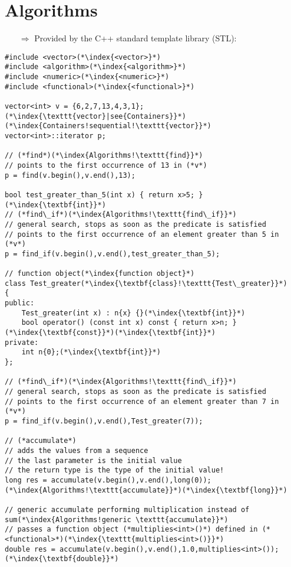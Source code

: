 \documentclass[10pt]{article}
\begin{document}
\section{Algorithms}
\small
\begin{enumerate}
\item[$\Rightarrow$] Provided by the C++ standard template library (STL):
\end{enumerate}
\begin{lstlisting}
#include <vector>(*\index{<vector>}*)
#include <algorithm>(*\index{<algorithm>}*)
#include <numeric>(*\index{<numeric>}*)
#include <functional>(*\index{<functional>}*)

vector<int> v = {6,2,7,13,4,3,1};(*\index{\texttt{vector}|see{Containers}}*)(*\index{Containers!sequential!\texttt{vector}}*)
vector<int>::iterator p;

// (*find*)(*\index{Algorithms!\texttt{find}}*)
// points to the first occurrence of 13 in (*v*)
p = find(v.begin(),v.end(),13);

bool test_greater_than_5(int x) { return x>5; }(*\index{\textbf{int}}*)
// (*find\_if*)(*\index{Algorithms!\texttt{find\_if}}*)
// general search, stops as soon as the predicate is satisfied
// points to the first occurrence of an element greater than 5 in (*v*)
p = find_if(v.begin(),v.end(),test_greater_than_5);

// function object(*\index{function object}*)
class Test_greater(*\index{\textbf{class}!\texttt{Test\_greater}}*)
{
public:
    Test_greater(int x) : n{x} {}(*\index{\textbf{int}}*)
    bool operator() (const int x) const { return x>n; }(*\index{\textbf{const}}*)(*\index{\textbf{int}}*)
private:
    int n{0};(*\index{\textbf{int}}*)
};

// (*find\_if*)(*\index{Algorithms!\texttt{find\_if}}*)
// general search, stops as soon as the predicate is satisfied
// points to the first occurrence of an element greater than 7 in (*v*)
p = find_if(v.begin(),v.end(),Test_greater(7));

// (*accumulate*)
// adds the values from a sequence
// the last parameter is the initial value
// the return type is the type of the initial value!
long res = accumulate(v.begin(),v.end(),long(0));(*\index{Algorithms!\texttt{accumulate}}*)(*\index{\textbf{long}}*)

// generic accumulate performing multiplication instead of sum(*\index{Algorithms!generic \texttt{accumulate}}*)
// passes a function object (*multiplies<int>()*) defined in (*<functional>*)(*\index{\texttt{multiplies<int>()}}*)
double res = accumulate(v.begin(),v.end(),1.0,multiplies<int>());(*\index{\textbf{double}}*)


\end{lstlisting}
\end{document}
